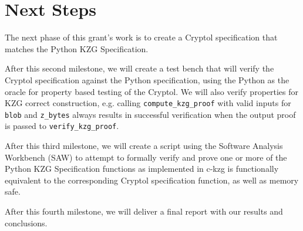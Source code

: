 \documentclass[12pt]{galois-whitepaper}
\begin{document}
\newpage
\section{Next Steps}
The next phase of this grant's work is to create a Cryptol specification that matches the Python KZG Specification.

After this second milestone, we will create a test bench that will verify the Cryptol specification against the Python specification, 
using the Python as the oracle for property based testing of the Cryptol. We will also verify properties for KZG correct construction,
e.g. calling \texttt{compute\_kzg\_proof} with valid inputs for \texttt{blob} and \texttt{z\_bytes} always results in successful 
verification when the output proof is passed to \texttt{verify\_kzg\_proof}.

After this third milestone, we will create a script using the Software Analysis Workbench (SAW) to attempt to formally verify and 
prove one or more of the Python KZG Specification functions as implemented in c-kzg is functionally equivalent to the corresponding Cryptol 
specification function, as well as memory safe.

After this fourth milestone, we will deliver a final report with our results and conclusions.
\end{document}
